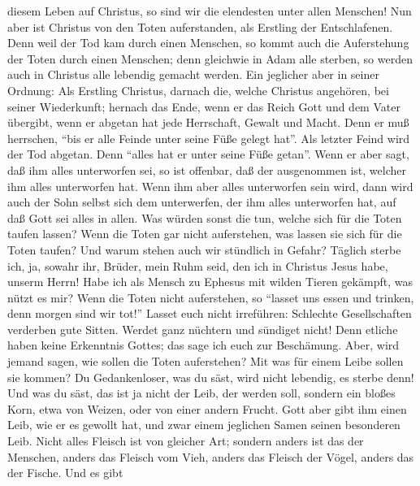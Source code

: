 diesem Leben auf Christus, so sind wir die elendesten unter allen
Menschen!  Nun aber ist Christus von den Toten
auferstanden, als Erstling der Entschlafenen.  Denn weil
der Tod kam durch einen Menschen, so kommt auch die Auferstehung der
Toten durch einen Menschen;  denn gleichwie in Adam alle
sterben, so werden auch in Christus alle lebendig gemacht werden.
 Ein jeglicher aber in seiner Ordnung: Als Erstling
Christus, darnach die, welche Christus angehören, bei seiner
Wiederkunft;  hernach das Ende, wenn er das Reich Gott
und dem Vater übergibt, wenn er abgetan hat jede Herrschaft, Gewalt und
Macht.  Denn er muß herrschen, ``bis er alle Feinde unter
seine Füße gelegt hat''.  Als letzter Feind wird der Tod
abgetan.  Denn ``alles hat er unter seine Füße getan''.
Wenn er aber sagt, daß ihm alles unterworfen sei, so ist offenbar, daß
der ausgenommen ist, welcher ihm alles unterworfen hat. 
Wenn ihm aber alles unterworfen sein wird, dann wird auch der Sohn
selbst sich dem unterwerfen, der ihm alles unterworfen hat, auf daß Gott
sei alles in allen.  Was würden sonst die tun, welche
sich für die Toten taufen lassen? Wenn die Toten gar nicht auferstehen,
was lassen sie sich für die Toten taufen?  Und warum
stehen auch wir stündlich in Gefahr?  Täglich sterbe ich,
ja, sowahr ihr, Brüder, mein Ruhm seid, den ich in Christus Jesus habe,
unserm Herrn!  Habe ich als Mensch zu Ephesus mit wilden
Tieren gekämpft, was nützt es mir? Wenn die Toten nicht auferstehen, so
``lasset uns essen und trinken, denn morgen sind wir tot!''
 Lasset euch nicht irreführen: Schlechte Gesellschaften
verderben gute Sitten.  Werdet ganz nüchtern und sündiget
nicht! Denn etliche haben keine Erkenntnis Gottes; das sage ich euch zur
Beschämung.  Aber, wird jemand sagen, wie sollen die
Toten auferstehen? Mit was für einem Leibe sollen sie kommen?
 Du Gedankenloser, was du säst, wird nicht lebendig, es
sterbe denn!  Und was du säst, das ist ja nicht der Leib,
der werden soll, sondern ein bloßes Korn, etwa von Weizen, oder von
einer andern Frucht.  Gott aber gibt ihm einen Leib, wie
er es gewollt hat, und zwar einem jeglichen Samen seinen besonderen
Leib.  Nicht alles Fleisch ist von gleicher Art; sondern
anders ist das der Menschen, anders das Fleisch vom Vieh, anders das
Fleisch der Vögel, anders das der Fische.  Und es gibt
